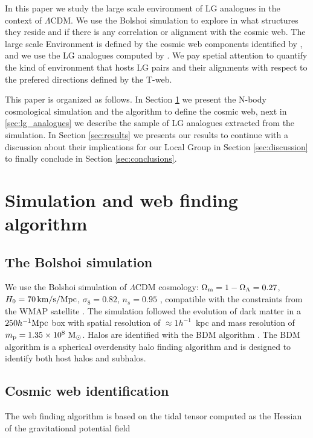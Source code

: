 \documentclass{emulateapj}
\newcommand{\manuscript}{paper }
\newcommand{\hmpc}{{\ifmmode{h^{-1}{\rm Mpc}}\else{$h^{-1}$Mpc }\fi}}
\begin{document}
In this \manuscript we study the large scale environment of LG 
analogues in the context of $\Lambda$CDM. We use the Bolshoi
simulation to explore in what structures they reside and if there is
any correlation or alignment with the cosmic web. The large scale
Environment is defined by the cosmic web components identified by
\citet{Tweb}, and we use the LG analogues computed by
\citet{lganalogues}. We pay spetial attention to quantify the kind of
environment that hosts LG pairs and their alignments with respect to
the prefered directions defined by the T-web. 
   
This \manuscript is organized as follows. In Section \ref{sec:simulation}
we present the N-body cosmological simulation and the algorithm to
define the cosmic web, next in \ref{sec:lg_analogues} we describe the
sample of LG analogues extracted from the simulation. In
Section \ref{sec:results} we presents our results to continue with a
discussion about their implications for our Local Group in Section
\ref{sec:discussion} to finally conclude in Section
\ref{sec:conclusions}. 


\section{Simulation and web finding algorithm}
\label{sec:simulation}

\subsection{The Bolshoi simulation}
We use the Bolshoi simulation of $\Lambda$CDM cosmology: $\Omega_{\rm
  m}=1-\Omega_{\Lambda}=0.27$, $H_0=70\,\rm km/s/Mpc$,
$\sigma_8=0.82$, $n_s=0.95$ \citep{2011ApJ...740..102K}, compatible
with the constraints from the WMAP satellite
\citep{hinshaw_etal13}. The simulation followed the evolution of dark
matter in a $250 \hmpc$ box with spatial resolution of $\approx
1h^{-1}$~kpc and mass resolution of $m_{\rm p}=1.35\times 10^8\ \rm
M_{\odot}$. Halos are identified with the BDM algorithm
\citep{1997astro.ph.12217K}. The BDM algorithm is  a spherical
overdensity halo finding algorithm and is designed to identify both
host halos and subhalos. 


\subsection{Cosmic web identification}
The web finding algorithm is based on the tidal tensor computed as the
Hessian of the  gravitational potential field
\end{document}
